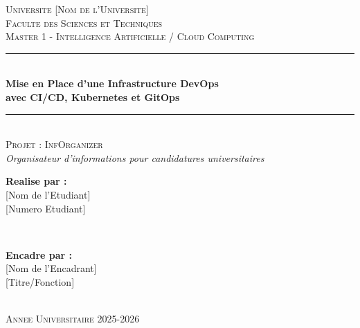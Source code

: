 \documentclass[12pt,a4paper,french]{report}
\begin{document}
\begin{titlepage}
    \centering
    \vspace*{1cm}

    \textsc{\LARGE Universite {[}Nom de l'Universite{]}}\\[0.5cm]
    \textsc{\Large Faculte des Sciences et Techniques}\\[0.3cm]
    \textsc{\large Master 1 - Intelligence Artificielle / Cloud Computing}\\[2cm]

    \rule{\linewidth}{0.5mm}\\[0.4cm]
    {\huge\bfseries Mise en Place d'une Infrastructure DevOps\\[0.2cm]
    avec CI/CD, Kubernetes et GitOps}\\[0.2cm]
    \rule{\linewidth}{0.5mm}\\[1.5cm]

    \textsc{\Large Projet : InfOrganizer}\\[0.3cm]
    \textit{Organisateur d'informations pour candidatures universitaires}\\[2cm]

    \begin{minipage}{0.4\textwidth}
        \begin{flushleft}
            \large
            \textbf{Realise par :}\\
            {[}Nom de l'Etudiant{]}\\
            {[}Numero Etudiant{]}
        \end{flushleft}
    \end{minipage}
    ~
    \begin{minipage}{0.4\textwidth}
        \begin{flushright}
            \large
            \textbf{Encadre par :}\\
            {[}Nom de l'Encadrant{]}\\
            {[}Titre/Fonction{]}
        \end{flushright}
    \end{minipage}\\[3cm]

    \textsc{\large Annee Universitaire 2025-2026}\\[1cm]

    \vfill

\end{titlepage}
\end{document}
